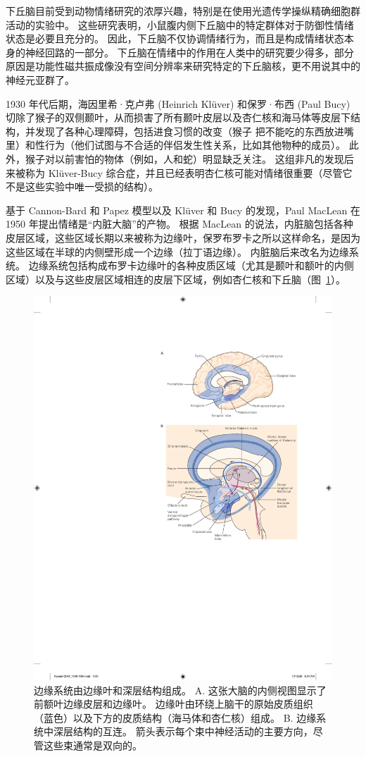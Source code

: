 下丘脑目前受到动物情绪研究的浓厚兴趣，特别是在使用光遗传学操纵精确细胞群活动的实验中。
这些研究表明，小鼠腹内侧下丘脑中的特定群体对于防御性情绪状态是必要且充分的。
因此，下丘脑不仅协调情绪行为，而且是构成情绪状态本身的神经回路的一部分。
下丘脑在情绪中的作用在人类中的研究要少得多，部分原因是功能性磁共振成像没有空间分辨率来研究特定的下丘脑核，更不用说其中的神经元亚群了。


1930 年代后期，海因里希·克卢弗 (Heinrich Klüver) 和保罗·布西 (Paul Bucy) 切除了猴子的双侧颞叶，从而损害了所有颞叶皮层以及杏仁核和海马体等皮层下结构，并发现了各种心理障碍，包括进食习惯的改变（猴子 把不能吃的东西放进嘴里）和性行为（他们试图与不合适的伴侣发生性关系，比如其他物种的成员）。
此外，猴子对以前害怕的物体（例如，人和蛇）明显缺乏关注。
这组非凡的发现后来被称为 Klüver-Bucy 综合症，并且已经表明杏仁核可能对情绪很重要（尽管它不是这些实验中唯一受损的结构）。


基于 Cannon-Bard 和 Papez 模型以及 Klüver 和 Bucy 的发现，Paul MacLean 在 1950 年提出情绪是“内脏大脑”的产物。
根据 MacLean 的说法，内脏脑包括各种皮层区域，这些区域长期以来被称为边缘叶，保罗布罗卡之所以这样命名，是因为这些区域在半球的内侧壁形成一个边缘（拉丁语边缘）。
内脏脑后来改名为边缘系统。 边缘系统包括构成布罗卡边缘叶的各种皮质区域（尤其是颞叶和额叶的内侧区域）以及与这些皮层区域相连的皮层下区域，例如杏仁核和下丘脑（图~\ref{fig:42_4}）。


\begin{figure}[htbp]
	\centering
	\includegraphics[width=0.6\linewidth]{chap42/fig_42_4}
	\caption{边缘系统由边缘叶和深层结构组成\cite{nieuwenhuys2007human}。
		A. 这张大脑的内侧视图显示了前额叶边缘皮层和边缘叶。
		边缘叶由环绕上脑干的原始皮质组织（蓝色）以及下方的皮质结构（海马体和杏仁核）组成。
		B. 边缘系统中深层结构的互连。
		箭头表示每个束中神经活动的主要方向，尽管这些束通常是双向的。}
	\label{fig:42_4}
\end{figure}


